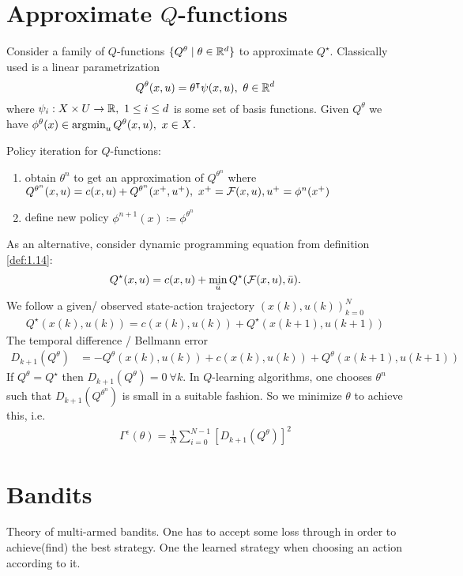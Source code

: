 \section{Approximate \(Q\)-functions}
Consider a family of \(Q\)-functions \(\{Q^\theta\mid \theta\in \mathbb{R}^d\}\)
to approximate \(Q^\star\). Classically used is a linear 
parametrization 
\[Q^\theta(x,u)=\theta^\intercal \psi(x,u),\  \theta\in\mathbb{R}^d\]  
where \(\psi_i:X\times U\to\mathbb{R},\ 1\leq i\leq d\) is some set of 
basis functions. 
Given \(Q^\theta\) we have \(\phi^\theta(x)\in\operatorname*{\text{argmin}}_{u}Q^\theta(x,u),\ x\in X\).

Policy iteration for \(Q\)-functions:
\begin{enumerate}
    \item obtain \(\theta^n\) to get an approximation of \(Q^{\theta^n}\)
          where \(Q^{\theta^n}(x,u)=c(x,u)+Q^{\theta^n}(x^+,u^+),\ x^+=\cF(x,u),u^+=\phi^n(x^+)\)
    \item define new policy \(\phi^{n+1}(x)\coloneqq \phi^{\theta^n}\) 
\end{enumerate}

As an alternative, consider dynamic programming equation from definition \ref{def:1.14}:
\begin{align*}
    Q^\star(x,u)=c(x,u)+\min_{\bar{u}}Q^\star(\mathcal{F}(x,u),\bar{u}).
\end{align*}
We follow a given/ observed state-action trajectory \((x(k),u(k))_{k=0}^N\)
\begin{align*}
    Q^\star(x(k),u(k))=c(x(k),u(k))+Q^\star(x(k+1),u(k+1))
\end{align*}
The temporal difference / Bellmann error 
\begin{align*}
    D_{k+1}(Q^\theta)&=-Q^\theta(x(k),u(k))+c(x(k),u(k))+Q^\theta(x(k+1),u(k+1))
\end{align*} 
If \(Q^\theta=Q^\star\) then \(D_{k+1}(Q^\theta)=0\ \forall k\). In \(Q\)-learning 
algorithms, one chooses \(\theta^n\) such that \(D_{k+1}(Q^{\theta^n})\)
is small in a suitable fashion. So we minimize \(\theta\) to achieve this, i.e. 
\begin{align*}
    \Gamma^\epsilon(\theta)=\frac{1}{N}\sum_{i=0}^{N-1}[D_{k+1}(Q^\theta)]^2
\end{align*} 

\section{Bandits}
Theory of multi-armed bandits. One has to accept some 
loss through  in order to achieve(find) the best strategy.
One  the learned strategy when choosing an action according to it.

